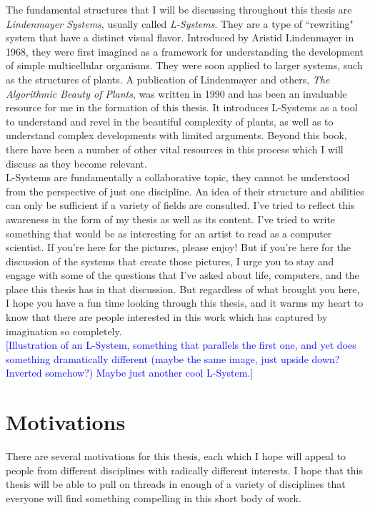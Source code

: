 \documentclass[12pt,twoside]{reedthesis}
\begin{document}
The fundamental structures that I will be discussing throughout this thesis are \textit{Lindenmayer Systems}, usually called \textit{L-Systems}. They are a type of ``rewriting" system that have a distinct visual flavor. Introduced by Aristid Lindenmayer in 1968, they were first imagined as a framework for understanding the development of simple multicellular organisms. They were soon applied to larger systems, such as the structures of plants. A publication of Lindenmayer and others, \textit{The Algorithmic Beauty of Plants}, was written in 1990 and has been an invaluable resource for me in the formation of this thesis. It introduces L-Systems as a tool to understand and revel in the beautiful complexity of plants, as well as to understand complex developments with limited arguments. Beyond this book, there have been a number of other vital resources in this process which I will discuss as they become relevant.\\

L-Systems are fundamentally a collaborative topic, they cannot be understood from the perspective of just one discipline. An idea of their structure and abilities can only be sufficient if a variety of fields are consulted. I've tried to reflect this awareness in the form of my thesis as well as its content. I've tried to write something that would be as interesting for an artist to read as a computer scientist. If you're here for the pictures, please enjoy! But if you're here for the discussion of the systems that create those pictures, I urge you to stay and engage with some of the questions that I've asked about life, computers, and the place this thesis has in that discussion. But regardless of what brought you here, I hope you have a fun time looking through this thesis, and it warms my heart to know that there are people interested in this work which has captured by imagination so completely.\\


\textcolor{blue}{[Illustration of an L-System, something that parallels the first one, and yet does something dramatically different (maybe the same image, just upside down? Inverted somehow?) Maybe just another cool L-System.]}


\section{Motivations}

There are several motivations for this thesis, each which I hope will appeal to people from different disciplines with radically different interests. I hope that this thesis will be able to pull on threads in enough of a variety of disciplines that everyone will find something compelling in this short body of work.\\
\end{document}
